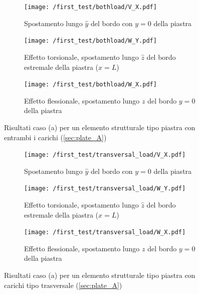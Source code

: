 \documentclass[a4paper,num-refs]{oup-contemporary}
\begin{document}
\begin{figure}[bt!]
	\centering

	\begin{subfigure}[t]{0.3\textwidth}
		\centering
		\texttt{[image: /first\_test/bothload/V\_X.pdf]}
		\caption{Spostamento lungo $\hat y$ del bordo con $y=0$ della piastra}
		
	\end{subfigure}
	\hfill
	\begin{subfigure}[t]{0.3\textwidth}
		\centering
\texttt{[image: /first\_test/bothload/W\_Y.pdf]}
		
		\caption{Effetto torsionale, spostamento lungo $\hat z$ del bordo estremale della piastra ($x=L$)}
		
	\end{subfigure}
	\hfill
	\begin{subfigure}[t]{0.3\textwidth}
		\centering
		\texttt{[image: /first\_test/bothload/W\_X.pdf]}
		\caption{Effetto flessionale, spostamento lungo $z$ del bordo $y=0$ della piastra}
		
	\end{subfigure}
	\hfill
	\caption{Risultati caso (a) per un elemento strutturale tipo piastra con entrambi i carichi (\cref{sec:plate_A})}
	\label{fig:plate_A_both_load}

	\centering
	
	\begin{subfigure}[t]{0.3\textwidth}
		\centering
		\texttt{[image: /first\_test/transversal\_load/V\_X.pdf]}
		\caption{Spostamento lungo $\hat y$ del bordo con $y=0$ della piastra}
		
	\end{subfigure}
	\hfill
	\begin{subfigure}[t]{0.3\textwidth}
		\centering
		\texttt{[image: /first\_test/transversal\_load/W\_Y.pdf]}
		
		\caption{Effetto torsionale, spostamento lungo $\hat z$ del bordo estremale della piastra ($x=L$)}
		
	\end{subfigure}
	\hfill
	\begin{subfigure}[t]{0.3\textwidth}
		\centering
		\texttt{[image: /first\_test/transversal\_load/W\_X.pdf]}
		\caption{Effetto flessionale, spostamento lungo $z$ del bordo $y=0$ della piastra}
		\label{fig:plate_A_extra}
	\end{subfigure}
	\hfill
	\caption{Risultati caso (a) per un elemento strutturale tipo piastra con carichi tipo trasversale (\cref{sec:plate_A})}
	\label{fig:plate_A_transload_load}


\end{figure}
\end{document}
